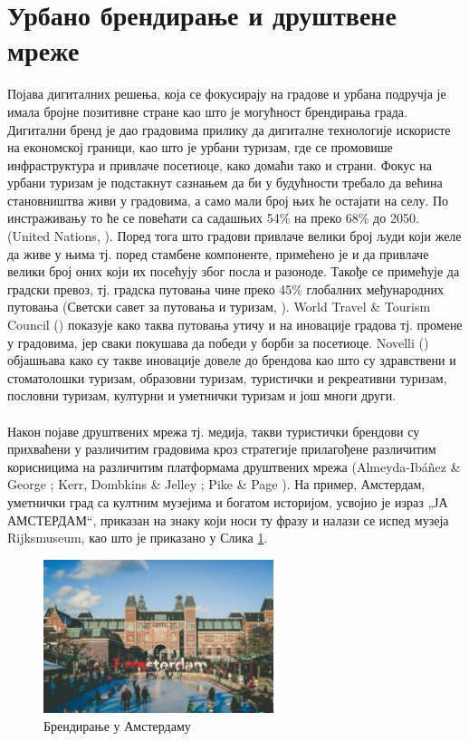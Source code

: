 \documentclass{article}
\begin{document}
\section{Урбано брендирање и друштвене мреже}
Појава дигиталних решења, која се фокусирају на градове и урбана подручја је имала бројне позитивне стране као што је могућност брендирања града. Дигитални бренд је дао градовима прилику да дигиталне технологије искористе на економској граници, као што је урбани туризам, где се промовише инфраструктура и привлаче посетиоце, како домаћи тако и страни. Фокус на урбани туризам је подстакнут сазнањем да би у будућности требало да већина становништва живи у градовима, а само мали број њих ће остајати на селу. По инстраживању то ће се повећати са садашњих 54\% на преко 68\% до 2050. (United Nations, \cite{un_2017}). Поред тога што градови привлаче велики број људи који желе да живе у њима тј. поред стамбене компоненте, примећено је и да привлаче велики број оних који их посећују због посла и разоноде. Такође се примећује да градски превоз, тј. градска путовања чине преко 45\% глобалних међународних путовања (Светски савет за путовања и туризам, \cite{wt_2018}). World Travel \& Tourism Council (\cite{wt_2018}) показује како таква путовања утичу и на иновације градова тј. промене у градовима, јер сваки покушава да победи у борби за посетиоце. Novelli (\cite{no_2005}) објашњава како су такве иновације довеле до брендова као што су здравствени и стоматолошки туризам, образовни туризам, туристички и рекреативни туризам, пословни туризам, културни и уметнички туризам и још многи други.
\\\\
Након појаве друштвених мрежа тј. медија, такви туристички брендови су прихваћени у различитим градовима кроз стратегије прилагођене различитим корисницима на различитим платформама друштвених мрежа (Almeyda-Ibáñez \& George \cite{ag_2017}; Kerr, Dombkins \& Jelley \cite{kdj_2012}; Pike \& Page \cite{pp_2014}).
На пример, Амстердам, уметнички град са култним музејима и богатом историјом, усвојио је израз „ЈА АМСТЕРДАМ“, приказан на  знаку који носи ту фразу и налази се испед музеја Rijksmuseum, као што је приказано у Слика \ref{fig:amsterdam}. 

\begin{figure}[h!]
\centering
\includegraphics[width=0.6\textwidth]{slike/amsterdam.png}
\caption{\label{fig:amsterdam}Брендирање у Амстердаму}
\end{figure}
\end{document}
